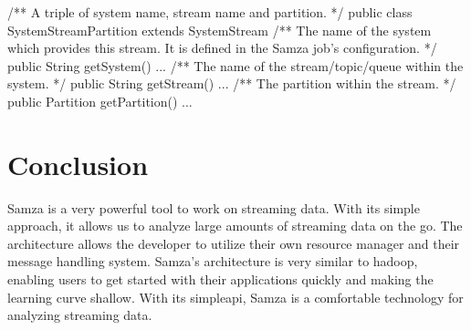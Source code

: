 \documentclass[9pt,twocolumn,twoside]{../../styles/osajnl}
\begin{document}
/** A triple of system name, stream name and partition. */\newline
public class SystemStreamPartition extends SystemStream {\newline
  /** The name of the system which provides this stream. It is
      defined in the Samza job's configuration. */\newline
  public String getSystem() { ... }\newline
  /** The name of the stream/topic/queue within the system. */\newline
  public String getStream() { ... }\newline
  /** The partition within the stream. */\newline
  public Partition getPartition() { ... }\newline
}

\section{Conclusion}
Samza is a very powerful tool to work on streaming data. With its simple
approach, it allows us to analyze large amounts of streaming data on the go. The
architecture allows the developer to utilize their own resource manager and
their message handling system. Samza's architecture is very similar to hadoop,
enabling users to get started with their applications quickly and making the
learning curve shallow. With its simpleapi, Samza is a comfortable technology
for analyzing streaming data.


\end{document}

